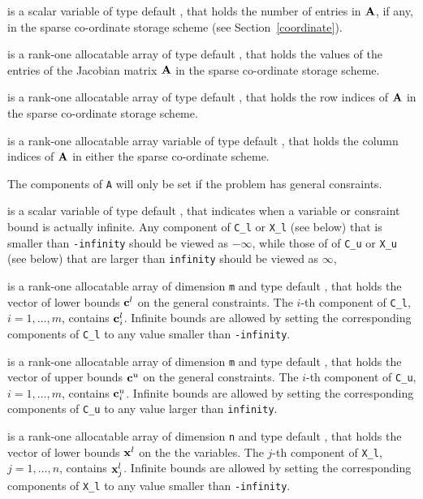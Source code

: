 \documentclass{galahad}
\begin{document}
\begin{description}
\begin{description}
 is a scalar variable of type default \integer, that
holds the number of entries in ${\mathbf{A}}$, if any,
in the sparse co-ordinate storage scheme (see Section~\ref{coordinate}).

 is a rank-one allocatable array of type default \realdp, that holds
the values of the entries of the Jacobian matrix ${\mathbf{A}}$
in the sparse co-ordinate storage scheme.

 is a rank-one allocatable array of type default \integer,
that holds the row indices of ${\mathbf{A}}$ in the sparse co-ordinate storage scheme.

 is a rank-one allocatable array variable of type default \integer,
that holds the column indices of ${\mathbf{A}}$ in either the sparse co-ordinate scheme.
\end{description}

The components of {\tt A} will only be set if the problem has general
consraints.

 is a scalar variable of type default \realdp, that indicates
when a variable or consraint bound is actually infinite. Any component
of {\tt C\_l} or {\tt X\_l} (see below) that is smaller than {\tt -infinity}
should be viewed as $- \infty$, while those of
of {\tt C\_u} or {\tt X\_u} (see below) that are larger than {\tt infinity}
should be viewed as $\infty$,

 is a rank-one allocatable array of dimension {\tt m} and type
default \realdp, that holds the vector of lower bounds ${\mathbf{c}}^{l}$
on the general constraints. The $i$-th component of
{\tt C\_l}, $i = 1, \ldots , m$, contains ${\mathbf{c}}_{i}^{l}$.
Infinite bounds are allowed by setting the corresponding
components of {\tt C\_l} to any value smaller than {\tt -infinity}.

 is a rank-one allocatable array of dimension {\tt m} and type
default \realdp, that holds the vector of upper bounds ${\mathbf{c}}^{u}$
on the general constraints. The $i$-th component of
{\tt C\_u}, $i = 1,  \ldots ,  m$, contains ${\mathbf{c}}_{i}^{u}$.
Infinite bounds are allowed by setting the corresponding
components of {\tt C\_u} to any value larger than {\tt infinity}.

 is a rank-one allocatable array of dimension {\tt n} and type
default \realdp, that holds
the vector of lower bounds ${\mathbf{x}}^{l}$ on the the variables.
The $j$-th component of {\tt X\_l}, $j = 1, \ldots , n$,
contains ${\mathbf{x}}_{j}^{l}$.
Infinite bounds are allowed by setting the corresponding
components of {\tt X\_l} to any value smaller than {\tt -infinity}.


\end{description}
\end{document}
